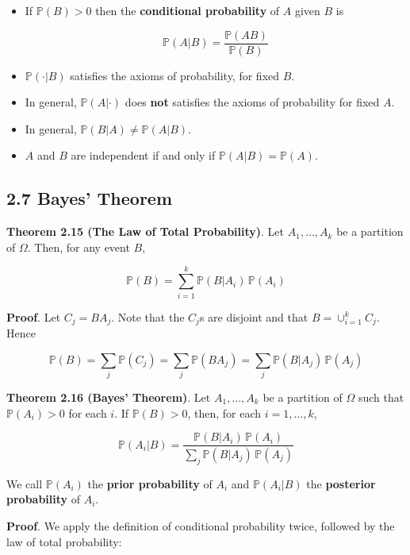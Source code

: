 \begin{itemize}
\item
  If \(\mathbb{P}(B) > 0\) then the \textbf{conditional probability} of
  \(A\) given \(B\) is

  \[ \mathbb{P}(A | B) = \frac{\mathbb{P}(AB)}{\mathbb{P}(B)} \]
\item
  \(\mathbb{P}(\cdot | B)\) satisfies the axioms of probability, for
  fixed \(B\). 
\item 
  In general, \(\mathbb{P}(A | \cdot)\) does \textbf{not}
  satisfies the axioms of probability for fixed \(A\).
\item
  In general, \(\mathbb{P}(B | A) \neq \mathbb{P}(A | B)\).
\item
  \(A\) and \(B\) are independent if and only if
  \(\mathbb{P}(A | B) = \mathbb{P}(A)\).
\end{itemize}

\subsection*{2.7 Bayes' Theorem}\label{bayes:theorem}

\textbf{Theorem 2.15 (The Law of Total Probability)}. Let
\(A_{1}, \dots, A_{k}\) be a partition of \(\Omega\). Then, for any event
\(B\),

\[ 
\mathbb{P}(B) 
= \sum_{i=1}^{k} \mathbb{P}(B | A_{i}) \, \mathbb{P}(A_{i}) 
\]

\textbf{Proof}. Let \(C_{j} = BA_{j}\). Note that the \(C_{j}\)s are disjoint
and that \(B = \cup_{i=1}^{k} C_{j}\). Hence

\[ 
\mathbb{P}(B) 
= \sum_{j} \mathbb{P}(C_{j})  
= \sum_{j} \mathbb{P}(BA_{j}) 
= \sum_{j} \mathbb{P}(B | A_{j}) \, \mathbb{P}(A_{j}) 
\]

\textbf{Theorem 2.16 (Bayes' Theorem)}. Let \(A_{1}, \dots, A_{k}\) be a
partition of \(\Omega\) such that \(\mathbb{P}(A_{i}) > 0\) for each
\(i\). If \(\mathbb{P}(B) > 0\), then, for each \(i = 1, \dots, k\),

\[ 
\mathbb{P}(A_{i} | B) = \frac{\mathbb{P}(B | A_{i}) \, \mathbb{P}(A_{i})}{\sum_{j} \mathbb{P}(B | A_{j}) \, \mathbb{P}(A_{j})} 
\]

We call \(\mathbb{P}(A_{i})\) the \textbf{prior probability} of \(A_{i}\)
and \(\mathbb{P}(A_{i} | B)\) the \textbf{posterior probability} of
\(A_{i}\).

\textbf{Proof}. We apply the definition of conditional probability
twice, followed by the law of total probability:


